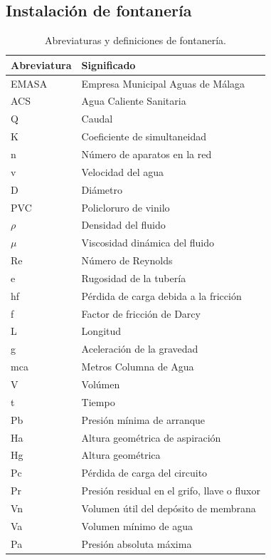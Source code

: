 \documentclass[../main.tex]{subfiles}
\begin{document}
\subsection{Instalación de fontanería}
\begin{table}[H]
    \centering
    \begin{tabular}{l|l}
         Abreviatura & Significado \\ \hline
         EMASA & Empresa Municipal Aguas de Málaga \\ \hline
         ACS & Agua Caliente Sanitaria \\ \hline
         Q & Caudal \\ \hline
         K & Coeficiente de simultaneidad \\ \hline
         n & Número de aparatos en la red \\  \hline
         v & Velocidad del agua \\ \hline
         D & Diámetro \\ \hline
         PVC & Policloruro de vinilo \\ \hline
         $\rho$ & Densidad del fluido \\ \hline
         $\mu$ & Viscosidad dinámica del fluido \\ \hline
         Re & Número de Reynolds \\ \hline
         e & Rugosidad de la tubería \\ \hline
         hf & Pérdida de carga debida a la fricción \\ \hline
         f & Factor de fricción de Darcy \\ \hline
         L & Longitud \\ \hline
         g & Aceleración de la gravedad \\ \hline
         mca & Metros Columna de Agua \\ \hline
         V & Volúmen \\ \hline
         t & Tiempo \\ \hline
         Pb & Presión mínima de arranque \\ \hline
         Ha & Altura geométrica de aspiración \\ \hline
         Hg & Altura geométrica \\ \hline
         Pc & Pérdida de carga del circuito \\ \hline
         Pr & Presión residual en el grifo, llave o fluxor \\ \hline
         Vn & Volumen útil del depósito de membrana \\ \hline
         Va & Volumen mínimo de agua \\ \hline
         Pa & Presión absoluta máxima
    \end{tabular}
    \caption{Abreviaturas y definiciones de fontanería.}
\end{table}
\end{document}
